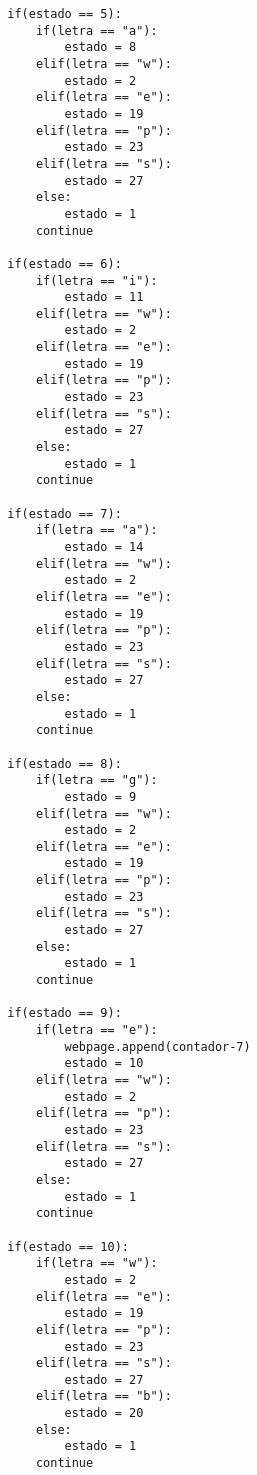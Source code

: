 \documentclass{article}
\begin{document}
\begin{lstlisting}
        if(estado == 5):
            if(letra == "a"):
                estado = 8
            elif(letra == "w"):
                estado = 2
            elif(letra == "e"):
                estado = 19
            elif(letra == "p"):
                estado = 23
            elif(letra == "s"):
                estado = 27
            else:
                estado = 1
            continue
        
        if(estado == 6):
            if(letra == "i"):
                estado = 11
            elif(letra == "w"):
                estado = 2
            elif(letra == "e"):
                estado = 19
            elif(letra == "p"):
                estado = 23
            elif(letra == "s"):
                estado = 27
            else:
                estado = 1
            continue
        
        if(estado == 7):
            if(letra == "a"):
                estado = 14
            elif(letra == "w"):
                estado = 2
            elif(letra == "e"):
                estado = 19
            elif(letra == "p"):
                estado = 23
            elif(letra == "s"):
                estado = 27
            else:
                estado = 1
            continue
        
        if(estado == 8):
            if(letra == "g"):
                estado = 9
            elif(letra == "w"):
                estado = 2
            elif(letra == "e"):
                estado = 19
            elif(letra == "p"):
                estado = 23
            elif(letra == "s"):
                estado = 27
            else:
                estado = 1
            continue
        
        if(estado == 9):
            if(letra == "e"):
                webpage.append(contador-7)
                estado = 10
            elif(letra == "w"):
                estado = 2
            elif(letra == "p"):
                estado = 23
            elif(letra == "s"):
                estado = 27
            else:
                estado = 1
            continue
        
        if(estado == 10):
            if(letra == "w"):
                estado = 2
            elif(letra == "e"):
                estado = 19
            elif(letra == "p"):
                estado = 23
            elif(letra == "s"):
                estado = 27
            elif(letra == "b"):
                estado = 20
            else:
                estado = 1
            continue
        

\end{lstlisting}
\end{document}
